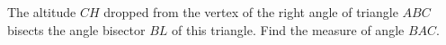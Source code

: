 The altitude $CH$ dropped from the vertex of the right angle of triangle $ABC$ bisects the angle bisector $BL$ of this triangle. Find the measure of angle $BAC$.
